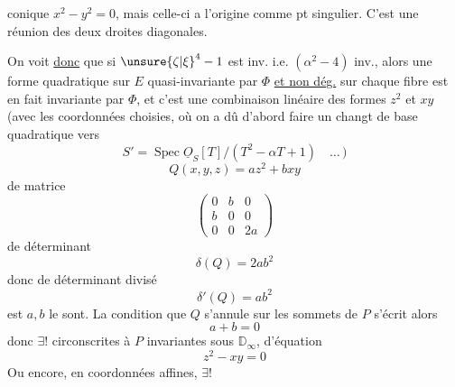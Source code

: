 conique $x^2-y^2=0$, mais celle-ci a l'origine comme pt singulier. C'est une réunion des deux droites diagonales.

On voit \uline{donc} que si ${\unsure{\zeta|\xi}}^{4}-1$ est inv. i.e. $(\alpha^2-4)$ inv., alors  une forme quadratique sur $E$ quasi-invariante par $\Phi$ \uline{et non dég.} sur chaque fibre est en fait invariante par $\Phi$, et c'est une combinaison linéaire des formes $z^2$ et $xy$ (avec les coordonnées choisies\unsure{\}|)},  où on a dû d'abord faire un changt de base quadratique vers
\[
S'=\operatorname{Spec}\underline O_S[T]/(T^2-\alpha T+1)\quad\ldots\,)
\]
\[
Q(x,y,z)=az^2+bxy\tag*{(5)}
\]
de  matrice
\[
\begin{pmatrix}0&b&0\\b&0&0\\0&0&2a\end{pmatrix}
\]
de déterminant
\[
\delta(Q)=2ab^2\tag*{(6)}
\]
donc de déterminant divisé
\[
\delta'(Q)=ab^2\tag*{(7)}
\]
 est   $a,b$ le sont. La condition que $Q$ s'annule sur les sommets de $P$ s'écrit alors
\[
a+b=0\tag*{(8)}
\]
donc  $\exists!$   circonscrites à $P$ invariantes sous $\mathbb D_\infty$,  d'équation
\[
z^2-xy=0\tag*{(9)}
\]
Ou encore, en coordonnées affines, $\exists!$
